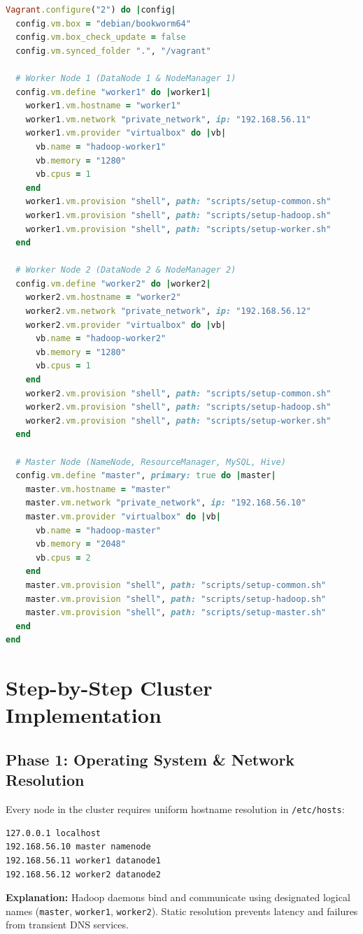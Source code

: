 \documentclass[11pt,a4paper]{article}
\begin{document}
\begin{lstlisting}[language=Ruby, caption={Complete Cluster Vagrantfile}]
Vagrant.configure("2") do |config|
  config.vm.box = "debian/bookworm64"
  config.vm.box_check_update = false
  config.vm.synced_folder ".", "/vagrant"

  # Worker Node 1 (DataNode 1 & NodeManager 1)
  config.vm.define "worker1" do |worker1|
    worker1.vm.hostname = "worker1"
    worker1.vm.network "private_network", ip: "192.168.56.11"
    worker1.vm.provider "virtualbox" do |vb|
      vb.name = "hadoop-worker1"
      vb.memory = "1280"
      vb.cpus = 1
    end
    worker1.vm.provision "shell", path: "scripts/setup-common.sh"
    worker1.vm.provision "shell", path: "scripts/setup-hadoop.sh"
    worker1.vm.provision "shell", path: "scripts/setup-worker.sh"
  end

  # Worker Node 2 (DataNode 2 & NodeManager 2)
  config.vm.define "worker2" do |worker2|
    worker2.vm.hostname = "worker2"
    worker2.vm.network "private_network", ip: "192.168.56.12"
    worker2.vm.provider "virtualbox" do |vb|
      vb.name = "hadoop-worker2"
      vb.memory = "1280"
      vb.cpus = 1
    end
    worker2.vm.provision "shell", path: "scripts/setup-common.sh"
    worker2.vm.provision "shell", path: "scripts/setup-hadoop.sh"
    worker2.vm.provision "shell", path: "scripts/setup-worker.sh"
  end

  # Master Node (NameNode, ResourceManager, MySQL, Hive)
  config.vm.define "master", primary: true do |master|
    master.vm.hostname = "master"
    master.vm.network "private_network", ip: "192.168.56.10"
    master.vm.provider "virtualbox" do |vb|
      vb.name = "hadoop-master"
      vb.memory = "2048"
      vb.cpus = 2
    end
    master.vm.provision "shell", path: "scripts/setup-common.sh"
    master.vm.provision "shell", path: "scripts/setup-hadoop.sh"
    master.vm.provision "shell", path: "scripts/setup-master.sh"
  end
end
\end{lstlisting}

\section{Step-by-Step Cluster Implementation}

\subsection{Phase 1: Operating System \& Network Resolution}
Every node in the cluster requires uniform hostname resolution in \texttt{/etc/hosts}:
\begin{lstlisting}[language=bash, caption={Static DNS Mapping in /etc/hosts}]
127.0.0.1 localhost
192.168.56.10 master namenode
192.168.56.11 worker1 datanode1
192.168.56.12 worker2 datanode2
\end{lstlisting}
\textbf{Explanation:} Hadoop daemons bind and communicate using designated logical names (\texttt{master}, \texttt{worker1}, \texttt{worker2}). Static resolution prevents latency and failures from transient DNS services.
\end{document}
